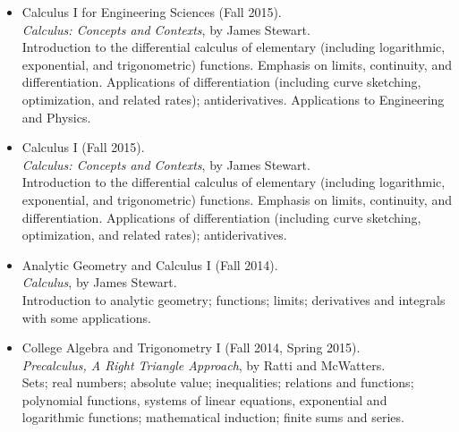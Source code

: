 \documentclass[11pt]{article}
\begin{document}
\begin{itemize}
  \item{}
    Calculus I for Engineering Sciences (Fall 2015).\\
    \emph{Calculus: Concepts and Contexts}, by James Stewart.\\
    Introduction to the differential calculus of elementary (including
    logarithmic, exponential, and trigonometric) functions. Emphasis on
    limits, continuity, and differentiation. Applications of
    differentiation (including curve sketching, optimization, and
    related rates); antiderivatives. Applications to Engineering and
    Physics.

  \item{}
    Calculus I (Fall 2015).\\
    \emph{Calculus: Concepts and Contexts}, by James Stewart.\\
    Introduction to the differential calculus of elementary (including
    logarithmic, exponential, and trigonometric) functions. Emphasis on
    limits, continuity, and differentiation. Applications of
    differentiation (including curve sketching, optimization, and
    related rates); antiderivatives.

\end{itemize}



\newpage




\begin{itemize}
  \item{}
    Analytic Geometry and Calculus I (Fall 2014).\\
    \emph{Calculus}, by James Stewart.\\
    Introduction to analytic geometry; functions; limits; derivatives
    and integrals with some applications.

  \item{}
    College Algebra and Trigonometry I (Fall 2014, Spring 2015).\\
    \emph{Precalculus, A Right Triangle Approach}, by Ratti and McWatters.\\
    Sets; real numbers; absolute value; inequalities; relations and
    functions; polynomial functions, systems of linear equations,
    exponential and logarithmic functions; mathematical induction;
    finite sums and series.

\end{itemize}
\end{document}
